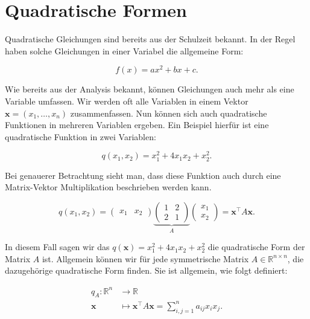 \setcounter{section}{6}
\section{Quadratische Formen}

Quadratische Gleichungen sind bereits aus der Schulzeit bekannt. In der Regel haben solche Gleichungen in einer Variabel die allgemeine Form:

\begin{equation*}
    f(x) = ax^2 + bx + c.
\end{equation*}

Wie bereits aus der Analysis bekannt, können Gleichungen auch mehr als eine Variable umfassen. Wir werden oft alle Variablen in einem Vektor \( \mathbf{x} = (x_1, \dots, x_n) \) zusammenfassen. Nun können sich auch quadratische Funktionen in mehreren Variablen ergeben. Ein Beispiel hierfür ist eine quadratische Funktion in zwei Variablen:

\begin{equation*}
    q(x_1,x_2) = x_1^2 + 4x_1x_2 + x_2^2.
\end{equation*}

Bei genauerer Betrachtung sieht man, dass diese Funktion auch durch eine Matrix-Vektor Multiplikation beschrieben werden kann. 

\begin{equation*}
    q(x_1, x_2) = \begin{pmatrix} x_1 & x_2 \end{pmatrix} \underbrace{\begin{pmatrix} 1 & 2 \\ 2 & 1 \end{pmatrix}}_{A} \begin{pmatrix} x_1 \\ x_2 \end{pmatrix} = \mathbf{x}^\top A \mathbf{x}.
\end{equation*}

In diesem Fall sagen wir das \( q(\mathbf{x}) = x_1^2 + 4x_1x_2 + x_2^2 \) die quadratische Form der Matrix \( A \) ist. Allgemein können wir für jede symmetrische Matrix \( A \in \mathbb{R}^{n \times n} \), die dazugehörige quadratische Form finden. Sie ist allgemein, wie folgt definiert:

\begin{equation*}
    \begin{aligned}
        q_A: \mathbb{R}^n &\longrightarrow \mathbb{R} \\
        \mathbf{x} &\longmapsto \mathbf{x}^\top A \mathbf{x} = \sum_{i,j=1}^{n} a_{ij}x_i x_j.
    \end{aligned}
\end{equation*}

